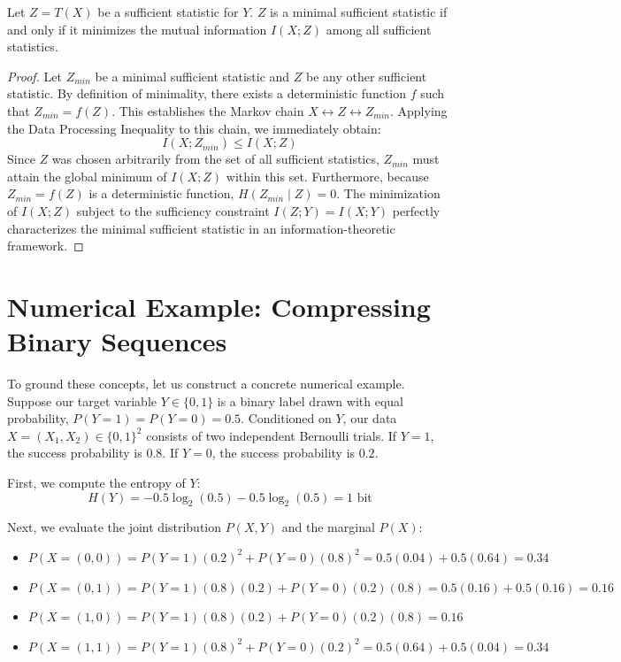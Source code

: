 \begin{theorem}
Let $Z = T(X)$ be a sufficient statistic for $Y$. $Z$ is a minimal sufficient statistic if and only if it minimizes the mutual information $I(X; Z)$ among all sufficient statistics.
\end{theorem}
\begin{proof}
Let $Z_{min}$ be a minimal sufficient statistic and $Z$ be any other sufficient statistic. By definition of minimality, there exists a deterministic function $f$ such that $Z_{min} = f(Z)$. This establishes the Markov chain $X \leftrightarrow Z \leftrightarrow Z_{min}$.
Applying the Data Processing Inequality to this chain, we immediately obtain:
\[ I(X; Z_{min}) \le I(X; Z) \]
Since $Z$ was chosen arbitrarily from the set of all sufficient statistics, $Z_{min}$ must attain the global minimum of $I(X; Z)$ within this set. Furthermore, because $Z_{min} = f(Z)$ is a deterministic function, $H(Z_{min} \mid Z) = 0$. The minimization of $I(X; Z)$ subject to the sufficiency constraint $I(Z; Y) = I(X; Y)$ perfectly characterizes the minimal sufficient statistic in an information-theoretic framework.
\end{proof}

\section{Numerical Example: Compressing Binary Sequences}

To ground these concepts, let us construct a concrete numerical example. Suppose our target variable $Y \in \{0, 1\}$ is a binary label drawn with equal probability, $P(Y=1) = P(Y=0) = 0.5$. 
Conditioned on $Y$, our data $X = (X_1, X_2) \in \{0, 1\}^2$ consists of two independent Bernoulli trials. If $Y=1$, the success probability is $0.8$. If $Y=0$, the success probability is $0.2$.

First, we compute the entropy of $Y$:
\[ H(Y) = -0.5 \log_2(0.5) - 0.5 \log_2(0.5) = 1 \text{ bit} \]

Next, we evaluate the joint distribution $P(X, Y)$ and the marginal $P(X)$:
\begin{itemize}
    \item $P(X=(0,0)) = P(Y=1)(0.2)^2 + P(Y=0)(0.8)^2 = 0.5(0.04) + 0.5(0.64) = 0.34$
    \item $P(X=(0,1)) = P(Y=1)(0.8)(0.2) + P(Y=0)(0.2)(0.8) = 0.5(0.16) + 0.5(0.16) = 0.16$
    \item $P(X=(1,0)) = P(Y=1)(0.8)(0.2) + P(Y=0)(0.2)(0.8) = 0.16$
    \item $P(X=(1,1)) = P(Y=1)(0.8)^2 + P(Y=0)(0.2)^2 = 0.5(0.64) + 0.5(0.04) = 0.34$
\end{itemize}

